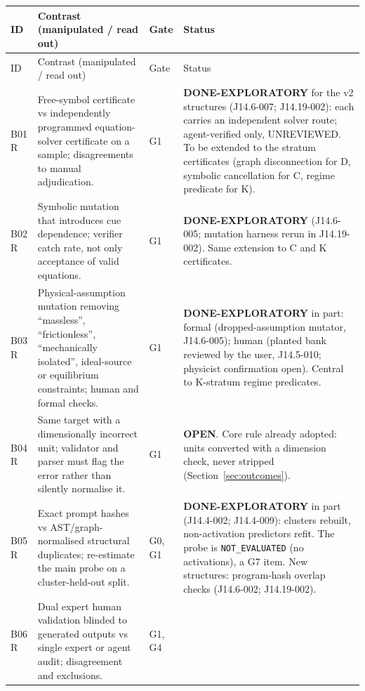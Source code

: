 \documentclass[10pt,a4paper]{article}
\newcommand{\NE}{\texttt{NOT\_EVALUATED}}
\begin{document}
\begingroup\small
\begin{longtable}{@{}P{1.2cm}P{7.2cm}P{1.3cm}P{5.6cm}@{}}
\toprule
ID & Contrast (manipulated / read out) & Gate & Status \\
\midrule
\endfirsthead
\toprule
ID & Contrast (manipulated / read out) & Gate & Status \\
\midrule
\endhead
\bottomrule
\endfoot
B01 \newline R & Free-symbol certificate vs independently programmed equation-solver certificate on a sample; disagreements to manual adjudication. & G1 &
\textbf{DONE-EXPLORATORY} for the v2 structures (J14.6-007; J14.19-002): each carries an independent solver route; agent-verified only, UNREVIEWED. To be extended to the stratum certificates (graph disconnection for D, symbolic cancellation for C, regime predicate for K). \\
B02 \newline R & Symbolic mutation that introduces cue dependence; verifier catch rate, not only acceptance of valid equations. & G1 &
\textbf{DONE-EXPLORATORY} (J14.6-005; mutation harness rerun in J14.19-002). Same extension to C and K certificates. \\
B03 \newline R & Physical-assumption mutation removing ``massless'', ``frictionless'', ``mechanically isolated'', ideal-source or equilibrium constraints; human and formal checks. & G1 &
\textbf{DONE-EXPLORATORY} in part: formal (dropped-assumption mutator, J14.6-005); human (planted bank reviewed by the user, J14.5-010; physicist confirmation open). Central to K-stratum regime predicates. \\
B04 \newline R & Same target with a dimensionally incorrect unit; validator and parser must flag the error rather than silently normalise it. & G1 &
\textbf{OPEN}. Core rule already adopted: units converted with a dimension check, never stripped (Section~\ref{sec:outcomes}). \\
B05 \newline R & Exact prompt hashes vs AST/graph-normalised structural duplicates; re-estimate the main probe on a cluster-held-out split. & G0, G1 &
\textbf{DONE-EXPLORATORY} in part (J14.4-002; J14.4-009): clusters rebuilt, non-activation predictors refit. The probe is \NE{} (no activations), a G7 item. New structures: program-hash overlap checks (J14.6-002; J14.19-002). \\
B06 \newline R & Dual expert human validation blinded to generated outputs vs single expert or agent audit; disagreement and exclusions. & G1, G4 &

\end{longtable}
\end{document}
